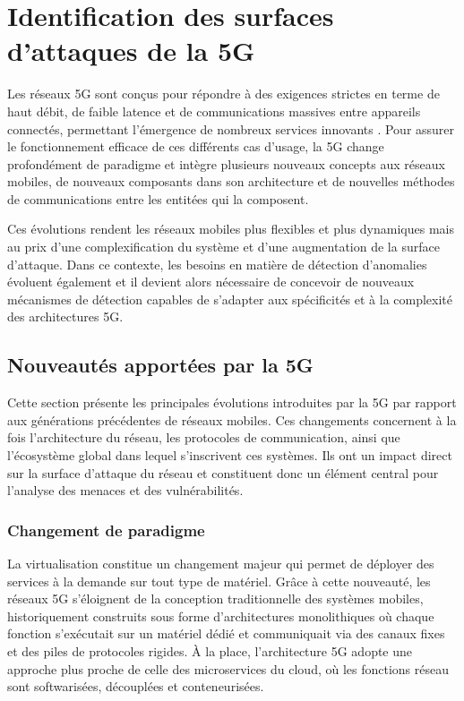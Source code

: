 \documentclass[a4paper,11pt,twoside]{StyleThese}
\providecommand{\minitoc}{}
\providecommand{\dominitoc}{}
\providecommand{\faketableofcontents}{}
\begin{document}
\dominitoc
\faketableofcontents
\fi

\chapter{Identification des surfaces d'attaques de la 5G}
\minitoc

Les réseaux 5G sont conçus pour répondre à des exigences strictes en terme de haut débit, de faible latence et de communications massives entre appareils connectés, permettant l’émergence de nombreux services innovants \cite{Gupta2015,Zaame2020}. Pour assurer le fonctionnement efficace de ces différents cas d’usage, la 5G change profondément de paradigme et intègre plusieurs nouveaux concepts aux réseaux mobiles, de nouveaux composants dans son architecture et de nouvelles méthodes de communications entre les entitées qui la composent. 

Ces évolutions rendent les réseaux mobiles plus flexibles et plus dynamiques mais au prix d'une complexification du système et d'une augmentation de la surface d'attaque. Dans ce contexte, les besoins en matière de détection d’anomalies évoluent également et il devient alors nécessaire de concevoir de nouveaux mécanismes de détection capables de s’adapter aux spécificités et à la complexité des architectures 5G.

\section{Nouveautés apportées par la 5G}
Cette section présente les principales évolutions introduites par la 5G par rapport aux générations précédentes de réseaux mobiles. Ces changements concernent à la fois l’architecture du réseau, les protocoles de communication, ainsi que l’écosystème global dans lequel s’inscrivent ces systèmes. Ils ont un impact direct sur la surface d’attaque du réseau et constituent donc un élément central pour l’analyse des menaces et des vulnérabilités.

\subsection{Changement de paradigme}
La virtualisation constitue un changement majeur qui permet de déployer des services à la demande sur tout type de matériel. Grâce à cette nouveauté, les réseaux 5G s’éloignent de la conception traditionnelle des systèmes mobiles, historiquement construits sous forme d’architectures monolithiques où chaque fonction s’exécutait sur un matériel dédié et communiquait via des canaux fixes et des piles de protocoles rigides. À la place, l’architecture 5G adopte une approche plus proche de celle des microservices du cloud, où les fonctions réseau sont softwarisées, découplées et conteneurisées.
\end{document}
